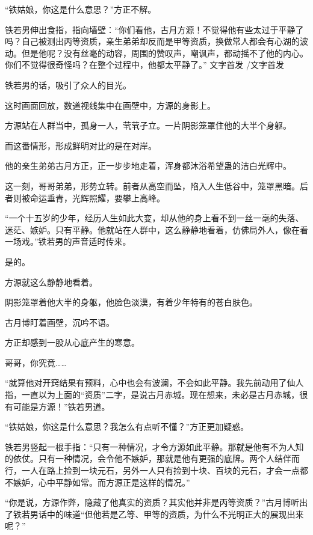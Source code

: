 
\begin{this_body}

“铁姑娘，你这是什么意思？”方正不解。

铁若男伸出食指，指向墙壁：“你们看他，古月方源！不觉得他有些太过于平静了吗？自己被测出丙等资质，亲生弟弟却反而是甲等资质，换做常人都会有心湖的波动。但是他呢？没有丝毫的动容，周围的赞叹声，嘲讽声，都动摇不了他的内心。你们不觉得很奇怪吗？在整个过程中，他都太平静了。” 文字首发 /文字首发

铁若男的话，吸引了众人的目光。

这时画面回放，数道视线集中在画壁中，方源的身影上。

方源站在人群当中，孤身一人，茕茕孑立。一片阴影笼罩住他的大半个身躯。

而这番情形，形成鲜明对比的是在对岸。

他的亲生弟弟古月方正，正一步步地走着，浑身都沐浴希望蛊的洁白光辉中。

这一刻，哥哥弟弟，形势立转。前者从高空而坠，陷入人生低谷中，笼罩黑暗。后者则被命运垂青，光辉照耀，要攀上高峰。

“一个十五岁的少年，经历人生如此大变，却从他的身上看不到一丝一毫的失落、迷茫、嫉妒。只有平静。他就站在人群中，这么静静地看着，仿佛局外人，像在看一场戏。”铁若男的声音适时传来。

是的。

方源就这么静静地看着。

阴影笼罩着他大半的身躯，他脸色淡漠，有着少年特有的苍白肤色。

古月博盯着画壁，沉吟不语。

方正却感到一股从心底产生的寒意。

哥哥，你究竟……

“就算他对开窍结果有预料，心中也会有波澜，不会如此平静。我先前动用了仙人指，一直以为上面的“资质”二字，是说古月赤城。现在想来，未必是古月赤城，很有可能是方源！”铁若男道。

“铁姑娘，你这是什么意思？我怎么有点听不懂？”方正更加疑惑。

铁若男竖起一根手指：“只有一种情况，才令方源如此平静。那就是他有不为人知的依仗。只有一种情况，会令他不嫉妒，那就是他有更强的底牌。两个人结伴而行，一人在路上捡到一块元石，另外一人只有捡到十块、百块的元石，才会一点都不嫉妒，心中平静如常。而方源正是这样的情况。”

“你是说，方源作弊，隐藏了他真实的资质？其实他并非是丙等资质？”古月博听出了铁若男话中的味道“但他若是乙等、甲等的资质，为什么不光明正大的展现出来呢？”


\end{this_body}
